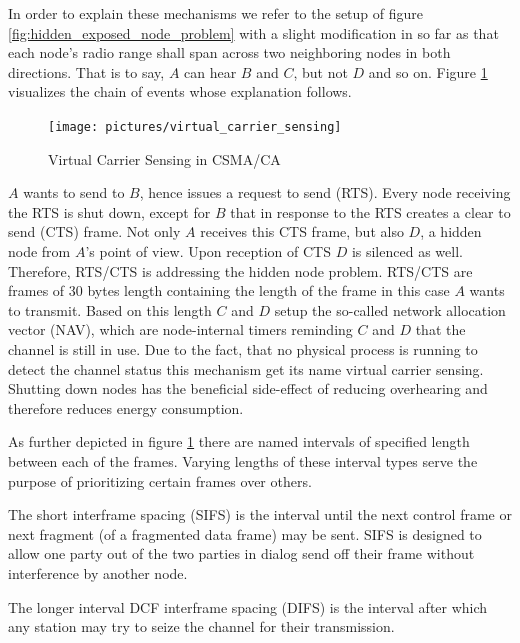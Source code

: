 \bigskip

In order to explain these mechanisms we refer to the setup of figure \ref{fig:hidden_exposed_node_problem} with a slight modification in so far as that each node's radio range shall span across two neighboring nodes in both directions. That is to say, $A$ can hear $B$ and $C$, but not $D$ and so on. Figure \ref{fig:virtual_carrier_sensing} visualizes the chain of events whose explanation follows.

\bigskip

\begin{figure}[ht]
	\label{fig:virtual_carrier_sensing}
	\begin{center}
		\texttt{[image: pictures/virtual\_carrier\_sensing]}
	\end{center}
	\caption{Virtual Carrier Sensing in CSMA/CA}
\end{figure}

$A$ wants to send to $B$, hence issues a request to send (RTS). Every node receiving the RTS is shut down, except for $B$ that in response to the RTS creates a clear to send (CTS) frame. Not only $A$ receives this CTS frame, but also $D$, a hidden node from $A$'s point of view. Upon reception of CTS $D$ is silenced as well. Therefore, RTS/CTS is addressing the hidden node problem. RTS/CTS are frames of 30 bytes length containing the length of the frame in this case $A$ wants to transmit. Based on this length $C$ and $D$ setup the so-called network allocation vector (NAV), which are node-internal timers reminding $C$ and $D$ that the channel is still in use. Due to the fact, that no physical process is running to detect the channel status this mechanism get its name virtual carrier sensing. Shutting down nodes has the beneficial side-effect of reducing overhearing and therefore reduces energy consumption.

\bigskip

As further depicted in figure \ref{fig:virtual_carrier_sensing} there are named intervals of specified length between each of the frames. Varying lengths of these interval types serve the purpose of prioritizing certain frames over others. 

\medskip
The short interframe spacing (SIFS) is the interval until the next control frame or next fragment (of a fragmented data frame) may be sent. SIFS is designed to allow one party out of the two parties in dialog send off their frame without interference by another node. 

\medskip
The longer interval DCF interframe spacing (DIFS) is the interval after which any station may try to seize the channel for their transmission.

